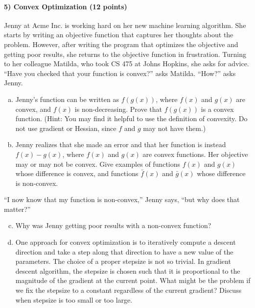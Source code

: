 \documentclass{article}
\begin{document}
\paragraph{5) Convex Optimization (12 points)}
Jenny at Acme Inc. is working hard on her new machine learning algorithm. She starts by writing an objective function
that captures her thoughts about the problem. However, after writing the program that optimizes the objective
and getting poor results, she returns to the objective function in frustration. Turning to her colleague Matilda,
who took CS 475 at Johns Hopkins, she asks for advice. ``Have you checked that your function is convex?'' asks Matilda.
``How?'' asks Jenny.
\begin{enumerate}[(a)]
	\item Jenny's function can be written as $f(g(x))$, where $f(x)$ and $g(x)$ are convex, and $f(x)$ is non-decreasing. Prove that $f(g(x))$ is a convex function. (Hint: You may find it helpful to use the definition of convexity. Do not use gradient or Hessian, since $f$ and $g$ may not have them.)
	\item Jenny realizes that she made an error and that her function is instead
		$f(x)-g(x)$, where $f(x)$ and $g(x)$ are convex functions. Her objective may or may not be convex. Give examples of functions $f(x)$ and $g(x)$ whose difference is convex, and functions $\bar{f}(x)$ and $\bar{g}(x)$ whose difference is non-convex.
\end{enumerate}
``I now know that my function is non-convex,'' Jenny says, ``but why does that matter?''
\begin{enumerate}[(a)]
		\setcounter{enumi}{2}
	\item Why was Jenny getting poor results with a non-convex function?
	\item One approach for convex optimization is to iteratively compute a descent direction and take a step along that direction to have a new value of the parameters. The choice of a proper stepsize is not so trivial. In gradient descent algorithm, the stepsize is chosen such that it is proportional to the magnitude of the gradient at the current point. What might be the problem if we fix the stepsize to a constant regardless of the current gradient? Discuss when stepsize is too small or too large.
\end{enumerate}
\end{document}

